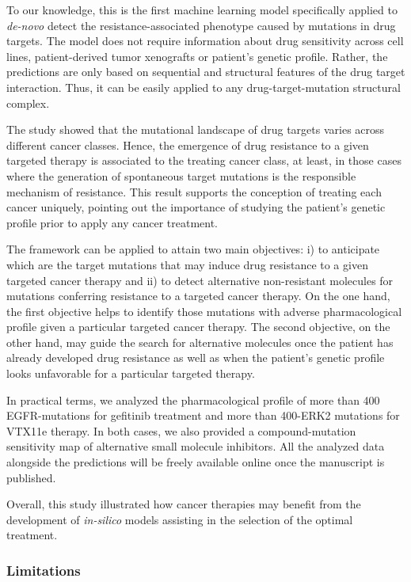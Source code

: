 \documentclass[11pt, b5paper,twoside]{tesi_upf}
\begin{document}
\par  To our knowledge, this is the first machine learning model specifically applied to \textit{de-novo} detect the resistance-associated phenotype caused by mutations in drug targets. The model does not require information about drug sensitivity across cell lines, patient-derived tumor xenografts or patient's genetic profile. Rather,  the predictions are only based on sequential and structural features of the drug target interaction. Thus, it can be easily applied to any drug-target-mutation structural complex. 
\par The study showed that the mutational landscape of drug targets varies across different cancer classes. Hence, the emergence of drug resistance to a given targeted therapy is associated to the treating cancer class, at least, in those cases where the generation of spontaneous target mutations is the responsible mechanism of resistance. This result supports the conception of treating each cancer uniquely, pointing out the importance of studying the patient's genetic profile prior to apply any cancer treatment.
\par  The framework can be applied to attain two main objectives: i) to anticipate which are the target mutations that may induce drug resistance to a given targeted cancer therapy and ii) to detect alternative non-resistant molecules for mutations conferring resistance to a targeted cancer therapy. On the one hand, the first objective helps to identify those mutations with adverse pharmacological profile given a particular targeted cancer therapy. The second objective, on the other hand, may guide the search for alternative molecules once the patient has already developed drug resistance as well as when the patient's genetic profile looks unfavorable for a particular targeted therapy.  
\par  In practical terms, we analyzed the pharmacological profile of more than 400 EGFR-mutations for gefitinib treatment and more than 400-ERK2 mutations for VTX11e therapy. In both cases, we also provided a compound-mutation sensitivity map of alternative small molecule inhibitors. All the analyzed data alongside the predictions will be freely available online once the manuscript is published. 
\par Overall, this study illustrated how cancer therapies may benefit from the development of \textit{in-silico} models assisting in the selection of the optimal treatment.   
 

\subsubsection{Limitations} 
\end{document}
